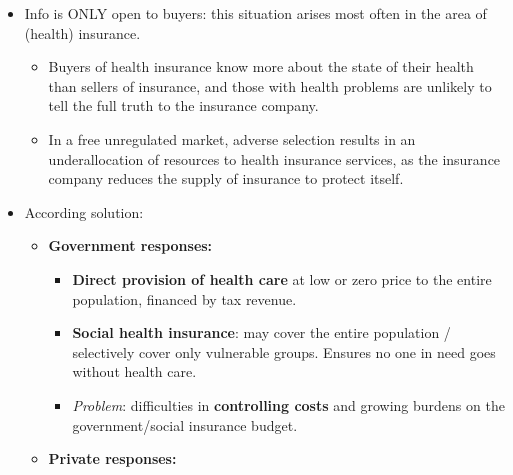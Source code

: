 \begin{itemize}
\begin{itemize}
      \begin{itemize}
        \item \textbf{Screening} (by the buyer): the party with limited information tries to learn more about the product/seller (e.g.\ online reviews, asking friends). \textit{Limitation}: cannot provide systematic, complete information to match the seller's knowledge.
        \item \textbf{Signalling} (by the seller): the party with more information tries to convince buyers of good quality (e.g.\ warranties, brand names, service records, fancy showrooms). \textit{Limitation}: unlikely to provide full information; may be inaccurate or misleading if sellers are eager to promote products.
      \end{itemize}
  \end{itemize}
  \item Info is ONLY open to buyers: this situation arises most often in the area of (health) insurance.
  \begin{itemize}
    \item Buyers of health insurance know more about the state of their health than sellers of insurance, and those with health problems are unlikely to tell the full truth to the insurance company.
    \item In a free unregulated market, adverse selection results in an underallocation of resources to health insurance services, as the insurance company reduces the supply of insurance to protect itself.
  \end{itemize}
  \item According solution:
  \begin{itemize}
    \item \textbf{Government responses:}
    \begin{itemize}
      \item \textbf{Direct provision of health care} at low or zero price to the entire population, financed by tax revenue.
      \item \textbf{Social health insurance}: may cover the entire population / selectively cover only vulnerable groups. Ensures no one in need goes without health care.
      \item \textit{Problem}: difficulties in \textbf{controlling costs} and growing burdens on the government/social insurance budget.
    \end{itemize}
    \item \textbf{Private responses:}
    \begin{itemize}

\end{itemize}
\end{itemize}
\end{itemize}
